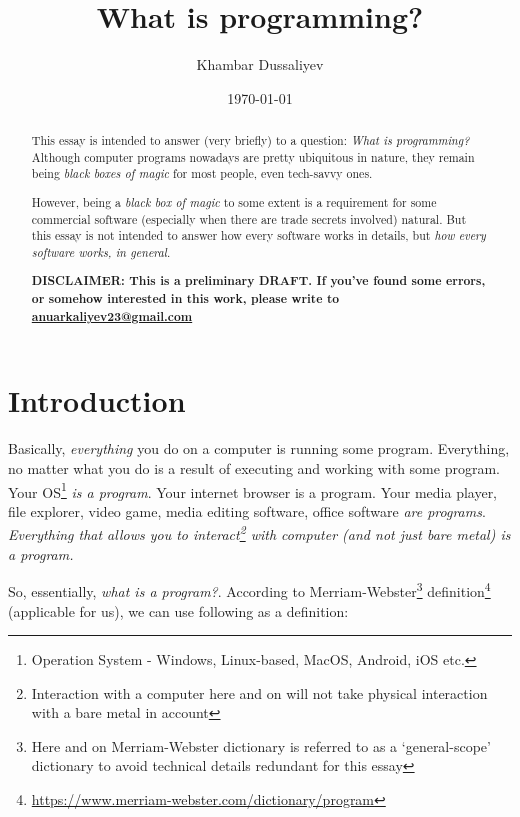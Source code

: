 \documentclass{article}
\title{What is programming?}
\author{Khambar Dussaliyev}
\date{\today}
\begin{document}
    \maketitle
    \begin{abstract}
        This essay is intended to answer (very briefly) to a question: \emph{What is programming?}
        Although computer programs nowadays are pretty ubiquitous in nature, they remain being \emph{black boxes of magic}
        for most people, even tech-savvy ones. \par
        
        However, being a \emph{black box of magic} to some extent is a requirement for some commercial software (especially when there are trade secrets involved) 
        natural. But this essay is not intended to answer how every software works in details, but \emph{how every software works, in general}. \par

        \textbf{
            DISCLAIMER: This is a preliminary DRAFT. If you've found some errors, or somehow interested in this work,
            please write to \href{mailto:anuarkaliyev23@gmail.com}{anuarkaliyev23@gmail.com}
            }
    \end{abstract}
    \newpage

    \tableofcontents
    \newpage

    \section{Introduction}

        Basically, \emph{everything} you do on a computer is running some program. Everything, no matter what you do is a result of executing and working with
        some program. Your OS\footnote{Operation System - Windows, Linux-based, MacOS, Android, iOS etc.} \emph{is a program}. Your internet browser is a program. 
        Your media player, file explorer, video game, media editing software, office software \emph{are programs}. 
        \emph{Everything that allows you to interact\footnote{Interaction with a computer here and on will not take physical interaction with a bare metal in account} 
        with computer (and not just bare metal) is a program.}
        
        So, essentially, \emph{what is a program?}. According to Merriam-Webster\footnote{Here and on Merriam-Webster dictionary is referred to as a `general-scope' dictionary to avoid technical details redundant for this essay} 
        definition\footnote{\href{https://www.merriam-webster.com/dictionary/program}{https://www.merriam-webster.com/dictionary/program}} 
        (applicable for us), we can use following as a definition:
        
\end{document}
